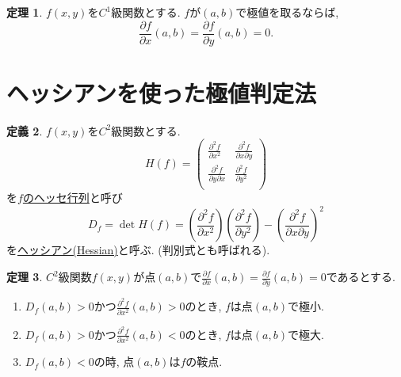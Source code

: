 \documentclass[dvipdfmx,a4paper,11pt]{article}
\theoremstyle{definition}
\newtheorem{thm}{定理}
\newtheorem{dfn}[thm]{定義}
\newcommand{\pdrv}[2]{\frac{\partial #1}{\partial #2}}
\newcommand{\ppdrv}[3]{\frac{\partial #1}{\partial #2 \partial #3}}
\begin{document}
    
\begin{tcolorbox}[
    colback = white,
    colframe = green!35!black,
    fonttitle = \bfseries,
    breakable = true]
    \begin{thm}
    $f(x,y)$を$C^1$級関数とする.
    $f$が$(a,b)$で極値を取るならば,
    $$
    \pdrv{f}{x}(a,b) = \pdrv{f}{y}(a,b) = 0.
    $$

    \end{thm}
    \end{tcolorbox}
\section{ヘッシアンを使った極値判定法}

\begin{tcolorbox}[
    colback = white,
    colframe = green!35!black,
    fonttitle = \bfseries,
    breakable = true]
    \begin{dfn}
    $f(x,y)$を$C^2$級関数とする.
$$H(f) = \left(\begin{array}{cc} \pdrv{^2f}{x^2}& \ppdrv{^2 f}{x}{y}\\ 
\ppdrv{^2 f}{y}{x}& \pdrv{^2f}{y^2}\\ \end{array} \right)$$
を\underline{$f$のヘッセ行列}と呼び
$$
D_f = \det H(f) = \left(\pdrv{^2f}{x^2}\right)\left(\pdrv{^2f}{y^2}\right)-\left(\ppdrv{^2 f}{x}{y}\right)^2
$$
を\underline{ヘッシアン(Hessian)}と呼ぶ. (判別式とも呼ばれる).
    \end{dfn}
    \end{tcolorbox}
    
    
 \begin{tcolorbox}[
    colback = white,
    colframe = green!35!black,
    fonttitle = \bfseries,
    breakable = true]
    \begin{thm}
    \label{kyokuchi}
   $C^2$級関数$f(x,y)$が点$(a,b)$で$\pdrv{f}{x}(a,b) = \pdrv{f}{y}(a,b) = 0$であるとする.
   
   \begin{enumerate}
   \item $D_f(a,b) >0$かつ$\pdrv{^2f}{x^2}(a,b) >0$のとき, $f$は点$(a,b)$で極小.
   \item $D_f(a,b) >0$かつ$\pdrv{^2f}{x^2}(a,b) <0$のとき, $f$は点$(a,b)$で極大.
   \item $D_f(a,b) <0$の時, 点$(a,b)$は$f$の鞍点.
   \end{enumerate}
       \end{thm}
    \end{tcolorbox}
\end{document}
